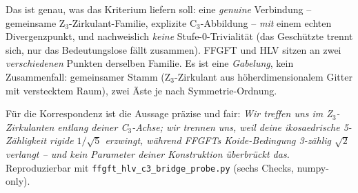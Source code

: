 Das ist genau, was das Kriterium liefern soll: eine \emph{genuine} Verbindung --
gemeinsame Z$_3$-Zirkulant-Familie, explizite C$_3$-Abbildung -- \emph{mit} einem
echten Divergenzpunkt, und nachweislich \emph{keine} Stufe-0-Trivialität (das
Geschützte trennt sich, nur das Bedeutungslose fällt zusammen). FFGFT und HLV
sitzen an zwei \emph{verschiedenen} Punkten derselben Familie. Es ist eine
\emph{Gabelung}, kein Zusammenfall: gemeinsamer Stamm (Z$_3$-Zirkulant aus
höherdimensionalem Gitter mit verstecktem Raum), zwei Äste je nach Symmetrie-Ordnung.

Für die Korrespondenz ist die Aussage präzise und fair: \emph{Wir treffen uns im
Z$_3$-Zirkulanten entlang deiner C$_3$-Achse; wir trennen uns, weil deine
ikosaedrische 5-Zähligkeit rigide $1/\sqrt5$ erzwingt, während FFGFTs
Koide-Bedingung 3-zählig $\sqrt2$ verlangt -- und kein Parameter deiner
Konstruktion überbrückt das.} Reproduzierbar mit
\texttt{ffgft\_hlv\_c3\_bridge\_probe.py} (sechs Checks, numpy-only).
